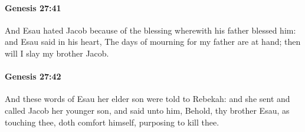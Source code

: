 		\paragraph{Genesis 27:41} %
			\label{GENESIS-27-41}

			And Esau hated Jacob because of the blessing wherewith his father blessed him: and Esau said in his heart, The days of mourning for my father are at hand; then will I slay my brother Jacob.


		\paragraph{Genesis 27:42} %
			\label{GENESIS-27-42}

			And these words of Esau her elder son were told to Rebekah: and she sent and called Jacob her younger son, and said unto him, Behold, thy brother Esau, as touching thee, doth comfort himself, purposing to kill thee.

